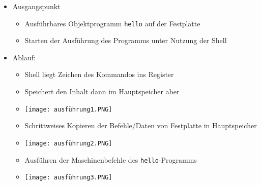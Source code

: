         \begin{itemize}
            \item Ausgangspunkt
                \begin{itemize}
                    \item Ausführbares Objektprogramm \texttt{hello} auf der Festplatte 
                    \item Starten der Ausführung des Programms unter Nutzung der Shell 
                \end{itemize}
            
            \item Ablauf:
                \begin{itemize}
                    \item Shell liegt Zeichen des Kommandos ins Register
                    \item Speichert den Inhalt dann im Hauptspeicher aber
                    \item[] \texttt{[image: ausführung1.PNG]}
                    \item Schrittweises Kopieren der Befehle/Daten von Festplatte in Hauptspeicher
                    \item[] \texttt{[image: ausführung2.PNG]}
                    \item Ausführen der Maschinenbefehle des \texttt{hello}-Programms
                    \item[] \texttt{[image: ausführung3.PNG]} 
                \end{itemize}
        \end{itemize}


\pagebreak


